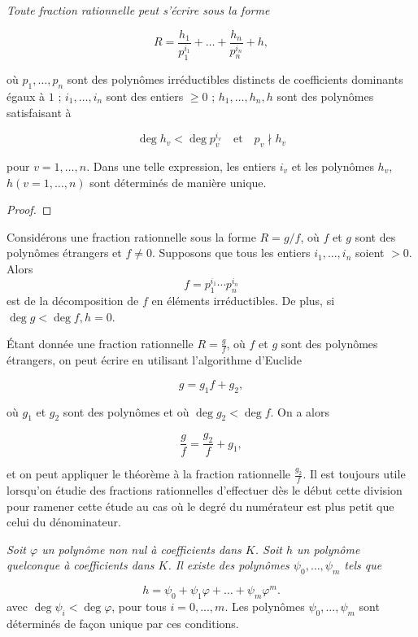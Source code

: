     \begin{theoreme}
         \textit{Toute fraction rationnelle peut s’écrire sous la forme}  

\[
R = \frac{h_1}{p_1^{i_1}} + \dots + \frac{h_n}{p_n^{i_n}} + h,
\]

où \( p_1, \dots, p_n \) sont des polynômes irréductibles distincts de coefficients dominants égaux à \( 1 \) ; \( i_1, \dots, i_n \) sont des entiers \( \geq 0 \) ; \( h_1, \dots, h_n, h \) sont des polynômes satisfaisant à  

\[
\deg h_v < \deg p_v^{i_v} \quad \text{et} \quad p_v \nmid h_v
\]

pour \( v = 1, \dots, n \). Dans une telle expression, les entiers \( i_v \) et les polynômes \( h_v \), \( h(v = 1, \dots, n) \) sont déterminés de manière unique.

    \end{theoreme}
\begin{proof}
    
\end{proof}

    \begin{theoreme}
        Considérons une fraction rationnelle sous la forme $R=g/f$, où $f$ et $g$ sont des polynômes étrangers et $f\neq 0$. Supposons que tous les entiers $i_1,...,i_n$ soient $>0$. Alors
        \[
        f=p_1^{i_1}\cdots p_n^{i_n}
        \]
        est de la décomposition de $f$ en éléments irréductibles. De plus, si $\operatorname{deg}g< \operatorname{deg}f,h=0$.
    \end{theoreme}

\begin{remarque}
    Étant donnée une fraction rationnelle \( R = \frac{g}{f} \), où \( f \) et \( g \) sont des polynômes étrangers, on peut écrire en utilisant l’algorithme d’Euclide  

\[
g = g_1 f + g_2,
\]

où \( g_1 \) et \( g_2 \) sont des polynômes et où \( \deg g_2 < \deg f \). On a alors  

\[
\frac{g}{f} = \frac{g_2}{f} + g_1,
\]

et on peut appliquer le théorème  à la fraction rationnelle \( \frac{g_2}{f} \). Il est toujours utile lorsqu’on étudie des fractions rationnelles d’effectuer dès le début cette division pour ramener cette étude au cas où le degré du numérateur est plus petit que celui du dénominateur.  
\end{remarque}

    \begin{theoreme}
         \textit{Soit \( \varphi \) un polynôme non nul à coefficients dans \( K \). Soit \( h \) un polynôme quelconque à coefficients dans \( K \). Il existe des polynômes \( \psi_0, \dots, \psi_m \) tels que}  

\[
h = \psi_0 + \psi_1 \varphi + \dots + \psi_m \varphi^m.
\]
avec $\operatorname{deg}\psi_i<\operatorname{deg}\varphi$, pour tous $i=0,...,m$. Les polynômes $\psi_0,...,\psi_m$ sont déterminés de façon unique par ces conditions.
    \end{theoreme}

